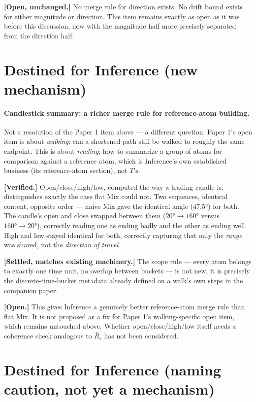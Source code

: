 \documentclass[11pt]{article}
\begin{document}
\textbf{[Open, unchanged.]} No merge rule for direction exists. No
drift bound exists for either magnitude or direction. This item
remains exactly as open as it was before this discussion, now with
the magnitude half more precisely separated from the direction half.

\section{Destined for Inference (new mechanism)}

\paragraph{Candlestick summary: a richer merge rule for reference-atom
building.} Not a resolution of the Paper 1 item above --- a different
question. Paper 1's open item is about \emph{walking}: can a shortened
path still be walked to roughly the same endpoint. This is about
\emph{reading}: how to summarize a group of atoms for comparison
against a reference atom, which is Inference's own established
business (its reference-atom section), not $T$'s.

\textbf{[Verified.]} Open/close/high/low, computed the way a trading
candle is, distinguishes exactly the case flat Mix could not. Two
sequences, identical content, opposite order --- naive Mix gave the
identical angle ($47.5°$) for both. The candle's open and close swapped
between them ($20°\!\to\!160°$ versus $160°\!\to\!20°$), correctly
reading one as ending badly and the other as ending well. High and low
stayed identical for both, correctly capturing that only the
\emph{range} was shared, not the \emph{direction of travel}.

\textbf{[Settled, matches existing machinery.]} The scope rule ---
every atom belongs to exactly one time unit, no overlap between
buckets --- is not new; it is precisely the discrete-time-bucket
metadata already defined on a walk's own steps in the companion paper.

\textbf{[Open.]} This gives Inference a genuinely better reference-atom
merge rule than flat Mix. It is not proposed as a fix for Paper 1's
walking-specific open item, which remains untouched above. Whether
open/close/high/low itself needs a coherence check analogous to
$\bar R_c$ has not been considered.

\section{Destined for Inference (naming caution, not yet a mechanism)}
\end{document}
